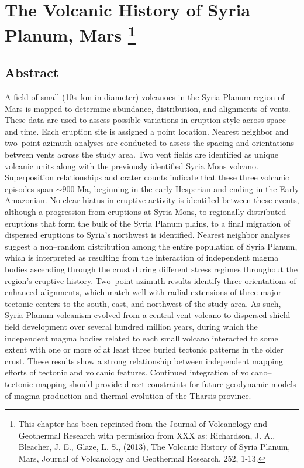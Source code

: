 \chapter[The Volcanic History of Syria Planum, Mars]{
The Volcanic History of Syria Planum, Mars \footnote{This chapter has been reprinted from the Journal of Volcanology and Geothermal Research with permission from XXX as: Richardson, J. A., Bleacher, J. E., Glaze, L. S., (2013), The Volcanic History of Syria Planum, Mars, Journal of Volcanology and Geothermal Research, 252, 1-13.}}

\section{Abstract}
A field of small (10s~km in diameter) volcanoes in the Syria Planum region of Mars is mapped to determine abundance, distribution, and alignments of vents.  These data are used to assess possible variations in eruption style across space and time. Each eruption site is assigned a point location. Nearest neighbor and two--point azimuth analyses are conducted to assess the spacing and orientations between vents across the study area. Two vent fields are identified as unique volcanic units along with the previously identified Syria Mons volcano.  Superposition relationships and crater counts indicate that these three volcanic episodes span $\sim$900 Ma, beginning in the early Hesperian and ending in the Early Amazonian. No clear hiatus in eruptive activity is identified between these events, although a progression from eruptions at Syria Mons, to regionally distributed eruptions that form the bulk of the Syria Planum plains, to a final migration of dispersed eruptions to Syria's northwest is identified. Nearest neighbor analyses suggest a non--random distribution among the entire population of Syria Planum, which is interpreted as resulting from the interaction of independent magma bodies ascending through the crust during different stress regimes throughout the region's eruptive history. Two--point azimuth results identify three orientations of enhanced alignments, which match well with radial extensions of three major tectonic centers to the south, east, and northwest of the study area. As such, Syria Planum volcanism evolved from a central vent volcano to dispersed shield field development over several hundred million years, during which the independent magma bodies related to each small volcano interacted to some extent with one or more of at least three buried tectonic patterns in the older crust.  These results show a strong relationship between independent mapping efforts of tectonic and volcanic features. Continued integration of volcano--tectonic mapping should provide direct constraints for future geodynamic models of magma production and thermal evolution of the Tharsis province.

